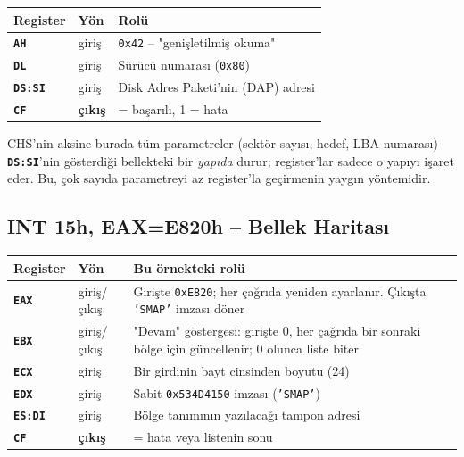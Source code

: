 \documentclass[11pt,a4paper]{article}
\newcommand{\reg}[1]{\texttt{\color{anaMavi}\textbf{#1}}}
\newcommand{\hx}[1]{\texttt{\color{turuncu}#1}}
\newcommand{\kod}[1]{\texttt{\color{koyuGri}#1}}
\begin{document}
\begin{center}
\begin{tabularx}{\textwidth}{@{}l l >{\raggedright\arraybackslash}X@{}}
\toprule
\rowcolor{anaMavi}\color{white}\textbf{Register} & \color{white}\textbf{Yön} & \color{white}\textbf{Rolü} \\
\midrule
\reg{AH} & giriş & \hx{0x42} -- "genişletilmiş okuma" \\
\rowcolor{acikGri} \reg{DL} & giriş & Sürücü numarası (\hx{0x80}) \\
\reg{DS:SI} & giriş & Disk Adres Paketi'nin (DAP) adresi \\
\rowcolor{acikGri} \reg{CF} & \textbf{çıkış} & 0 = başarılı, 1 = hata \\
\bottomrule
\end{tabularx}
\end{center}
CHS'nin aksine burada tüm parametreler (sektör sayısı, hedef, LBA numarası)
\reg{DS:SI}'nin gösterdiği bellekteki bir \emph{yapıda} durur; register'lar
sadece o yapıyı işaret eder. Bu, çok sayıda parametreyi az register'la
geçirmenin yaygın yöntemidir.

\subsection{INT 15h, EAX=E820h -- Bellek Haritası}

\begin{center}
\small
\begin{tabularx}{\textwidth}{@{}l l >{\raggedright\arraybackslash}X@{}}
\toprule
\rowcolor{anaMavi}\color{white}\textbf{Register} & \color{white}\textbf{Yön} & \color{white}\textbf{Bu örnekteki rolü} \\
\midrule
\reg{EAX} & giriş/çıkış & Girişte \hx{0xE820}; her çağrıda yeniden ayarlanır. Çıkışta \kod{'SMAP'} imzası döner \\
\rowcolor{acikGri} \reg{EBX} & giriş/çıkış & "Devam" göstergesi: girişte 0, her çağrıda bir sonraki bölge için güncellenir; 0 olunca liste biter \\
\reg{ECX} & giriş & Bir girdinin bayt cinsinden boyutu (24) \\
\rowcolor{acikGri} \reg{EDX} & giriş & Sabit \hx{0x534D4150} imzası (\kod{'SMAP'}) \\
\reg{ES:DI} & giriş & Bölge tanımının yazılacağı tampon adresi \\
\rowcolor{acikGri} \reg{CF} & \textbf{çıkış} & 1 = hata veya listenin sonu \\
\bottomrule
\end{tabularx}
\end{center}
\end{document}
